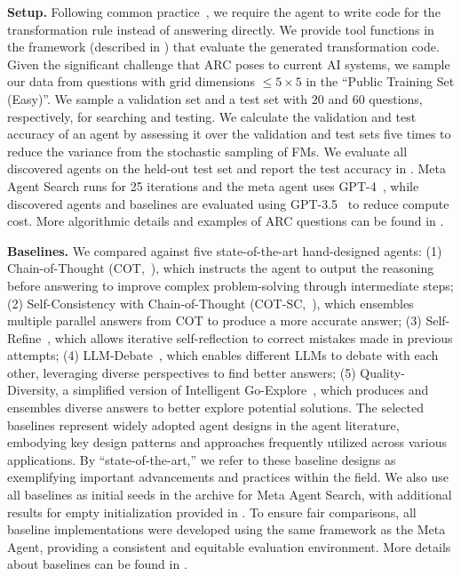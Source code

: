 \documentclass{article}
\newcommand{\ouralgo}{Meta Agent Search\xspace}
\begin{document}
\noindent\textbf{Setup.}\hspace{0.5em} Following common practice~\citep{Greenblatt2024arcSOTA}, we require the agent to write code for the transformation rule instead of answering directly. We provide tool functions in the framework (described in ) that evaluate the generated transformation code.
Given the significant challenge that ARC poses to current AI systems, we sample our data from questions with grid dimensions $\leq 5\times 5$ in the ``Public Training Set (Easy)''.
We sample a validation set and a test set with 20 and 60 questions, respectively, for searching and testing.
We calculate the validation and test accuracy of an agent by assessing it over the validation and test sets five times to reduce the variance from the stochastic sampling of FMs.
We evaluate all discovered agents on the held-out test set and report the test accuracy in .
\ouralgo runs for 25 iterations and the meta agent uses GPT-4~\citep{openai2024gpt4}, while discovered agents and baselines are evaluated using GPT-3.5~\citep{openai_gpt3.5} to reduce compute cost.
More algorithmic details and examples of ARC questions can be found in .


\noindent\textbf{Baselines.}\hspace{0.5em} We compared against five state-of-the-art hand-designed agents: (1) Chain-of-Thought (COT,~\citet{wei2022chain}), which instructs the agent to output the reasoning before answering to improve complex problem-solving through intermediate steps; (2) Self-Consistency with Chain-of-Thought (COT-SC,~\citet{wang2023selfconsistency}), which ensembles multiple parallel answers from COT to produce a more accurate answer; (3) Self-Refine~\citep{madaan2024self,shinn2024reflexion}, which allows iterative self-reflection to correct mistakes made in previous attempts; (4) LLM-Debate~\citep{du2023improving}, which enables different LLMs to debate with each other, leveraging diverse perspectives to find better answers; (5) Quality-Diversity, a simplified version of Intelligent Go-Explore~\citep{lu2024intelligent}, which produces and ensembles diverse answers to better explore potential solutions. The selected baselines represent widely adopted agent designs in the agent literature, embodying key design patterns and approaches frequently utilized across various applications. By “state-of-the-art,” we refer to these baseline designs as exemplifying important advancements and practices within the field.
We also use all baselines as initial seeds in the archive for \ouralgo, with additional results for empty initialization provided in .
To ensure fair comparisons, all baseline implementations were developed using the same framework as the Meta Agent, providing a consistent and equitable evaluation environment.
More details about baselines can be found in . 
\end{document}
